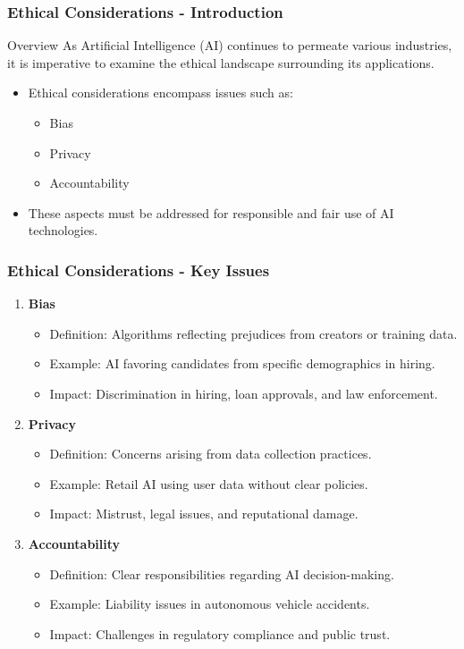 \documentclass{beamer}
\begin{document}
\begin{frame}[fragile]
    \frametitle{Ethical Considerations - Introduction}
    \begin{block}{Overview}
        As Artificial Intelligence (AI) continues to permeate various industries, it is imperative to examine the ethical landscape surrounding its applications.
    \end{block}
    \begin{itemize}
        \item Ethical considerations encompass issues such as:
        \begin{itemize}
            \item Bias
            \item Privacy
            \item Accountability
        \end{itemize}
        \item These aspects must be addressed for responsible and fair use of AI technologies.
    \end{itemize}
\end{frame}

\begin{frame}[fragile]
    \frametitle{Ethical Considerations - Key Issues}
    \begin{enumerate}
        \item \textbf{Bias}
            \begin{itemize}
                \item Definition: Algorithms reflecting prejudices from creators or training data.
                \item Example: AI favoring candidates from specific demographics in hiring.
                \item Impact: Discrimination in hiring, loan approvals, and law enforcement.
            \end{itemize}
        
        \item \textbf{Privacy}
            \begin{itemize}
                \item Definition: Concerns arising from data collection practices.
                \item Example: Retail AI using user data without clear policies.
                \item Impact: Mistrust, legal issues, and reputational damage.
            \end{itemize}
        
        \item \textbf{Accountability}
            \begin{itemize}
                \item Definition: Clear responsibilities regarding AI decision-making.
                \item Example: Liability issues in autonomous vehicle accidents.
                \item Impact: Challenges in regulatory compliance and public trust.
            \end{itemize}
    \end{enumerate}
\end{frame}
\end{document}
